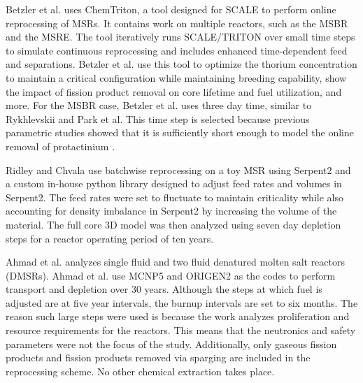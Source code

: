 Betzler et al. \cite{betzler_molten_2017} uses ChemTriton, a tool designed for SCALE to perform online reprocessing of MSRs. It contains work on multiple reactors, such as the MSBR and the MSRE. The tool iteratively runs SCALE/TRITON over small time steps to simulate continuous reprocessing and includes enhanced time-dependent feed and separations.
Betzler et al. use this tool to optimize the thorium concentration to maintain a critical configuration while maintaining breeding capability, show the impact of fission product removal on core lifetime and fuel utilization, and more.
For the MSBR case, Betzler et al. uses three day time, similar to Rykhlevskii and Park et al.
This time step is selected because previous parametric studies showed that it is sufficiently short enough to model the online removal of protactinium \cite{powers_new_2013}.

Ridley and Chvala \cite{ridley_method_2017} use batchwise reprocessing on a toy MSR using Serpent2 and a custom in-house python library designed to adjust feed rates and volumes in Serpent2. The feed rates were set to fluctuate to maintain criticality while also accounting for density imbalance in Serpent2 by increasing the volume of the material. The full core 3D model was then analyzed using seven day depletion steps for a reactor operating period of ten years.

Ahmad et al. \cite{ahmad_neutronics_2015} analyzes single fluid and two fluid denatured molten salt reactors (DMSRs). Ahmad et al. use MCNP5 and ORIGEN2 as the codes to perform transport and depletion over 30 years. Although the steps at which fuel is adjusted are at five year intervals, the burnup intervals are set to six months. The reason such large steps were used is because the work analyzes proliferation and resource requirements for the reactors. This means that the neutronics and safety parameters were not the focus of the study. Additionally, only gaseous fission products and fission products removed via sparging are included in the reprocessing scheme. No other chemical extraction takes place.

